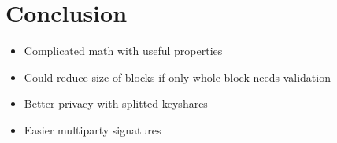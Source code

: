 \documentclass[a4paper,12pt]{scrartcl}
\begin{document}
\pagebreak

\section{Conclusion}

\begin{itemize}
	\item Complicated math with useful properties
	\item Could reduce size of blocks if only whole block needs validation
	\item Better privacy with splitted keyshares
	\item Easier multiparty signatures
\end{itemize}

\nocite{*}

\printbibliography
\end{document}
